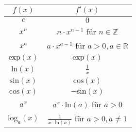 \begin{center}
\begin{tabular}{c|c}
$f(x)$ & $f'(x)$ \\ \hline
$c$ & $0$ \\
$x^n$ & $n \cdot x^{n-1}$ für $n \in \mathbb{Z}$ \\
$x^a$ & $a \cdot x^{a-1}$ für $a > 0, a \in \mathbb{R}$ \\
$\text{exp}(x)$ & $\text{exp}(x)$ \\
$\text{ln}(x)$ & $\frac{1}{x}$ \\
$\text{sin}(x)$ & $\text{cos}(x)$ \\
$\text{cos}(x)$ & $-\text{sin}(x)$ \\
$a^x$ & $a^x \cdot \text{ln}(a)$ für $a > 0$ \\
$\text{log}_a(x)$ & $\frac{1}{x\cdot\text{ln}(a)}$ für $a > 0, a \neq 1$
\end{tabular}
\end{center}










